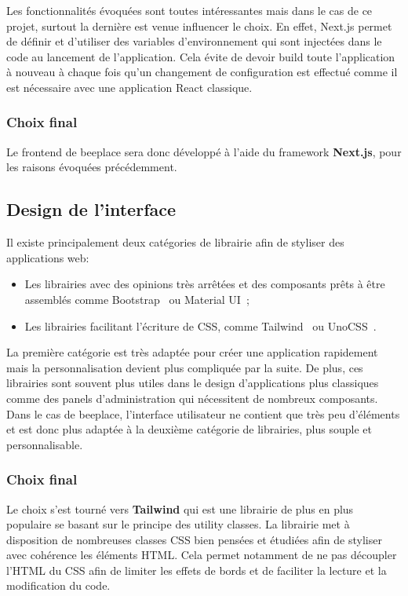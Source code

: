 Les fonctionnalités évoquées sont toutes intéressantes mais dans le cas de ce projet, surtout la dernière est venue influencer le choix. En effet, Next.js permet de définir et d'utiliser des variables d'environnement qui sont injectées dans le code au lancement de l'application. Cela évite de devoir build toute l'application à nouveau à chaque fois qu'un changement de configuration est effectué comme il est nécessaire avec une application React classique.

\subsubsection{Choix final}

Le frontend de \gls{beeplace} sera donc développé à l'aide du framework \textbf{Next.js}, pour les raisons évoquées précédemment.

\subsection{Design de l'interface}

Il existe principalement deux catégories de librairie afin de styliser des applications web:

\begin{itemize}
  \item Les librairies avec des opinions très arrêtées et des composants prêts à être assemblés comme Bootstrap~\cite{bootstrap} ou Material UI~\cite{mui};
  \item Les librairies facilitant l'écriture de CSS, comme Tailwind~\cite{tailwindcss} ou UnoCSS~\cite{unocss}.
\end{itemize}

La première catégorie est très adaptée pour créer une application rapidement mais la personnalisation devient plus compliquée par la suite. De plus, ces librairies sont souvent plus utiles dans le design d'applications plus classiques comme des panels d'administration qui nécessitent de nombreux composants. Dans le cas de \gls{beeplace}, l'interface utilisateur ne contient que très peu d'éléments et est donc plus adaptée à la deuxième catégorie de librairies, plus souple et personnalisable.

\subsubsection{Choix final}

Le choix s'est tourné vers \textbf{Tailwind} qui est une librairie de plus en plus populaire se basant sur le principe des utility classes. La librairie met à disposition de nombreuses classes CSS bien pensées et étudiées afin de styliser avec cohérence les éléments HTML. Cela permet notamment de ne pas découpler l'HTML du CSS afin de limiter les effets de bords et de faciliter la lecture et la modification du code.

